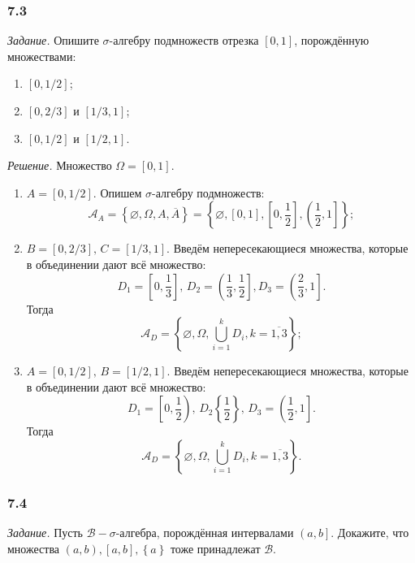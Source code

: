 \subsubsection*{7.3}

\textit{Задание.} Опишите $ \sigma $-алгебру подмножеств отрезка $ \left[ 0, 1 \right] $, порождённую множествами:
\begin{enumerate}[label=\alph*)]
\item $ \left[ 0, 1/2 \right] $;
\item $ \left[ 0, 2/3 \right] $ и $ \left[ 1/3, 1 \right] $;
\item $ \left[ 0, 1/2 \right] $ и $ \left[ 1/2,  1 \right] $.
\end{enumerate}

\textit{Решение.} Множество $ \Omega = \left[ 0, 1 \right] $.

\begin{enumerate}[label=\alph*)]
\item $A = \left[ 0, 1/2 \right] $.
Опишем $ \sigma $-алгебру подмножеств:
$$ \mathcal{A}_A =
\left\{ \varnothing, \Omega, A, \overline{A} \right\} =
\left\{ \varnothing, \left[ 0, 1 \right], \left[ 0, \frac{1}{2} \right], \left( \frac{1}{2}, 1 \right] \right\};$$
\item $B = \left[ 0, 2/3 \right], \, C = \left[ 1/3, 1 \right] $.
Введём непересекающиеся множества, которые в объединении дают всё множество:
$$D_1 =
\left[ 0, \frac{1}{3} \right], \,
D_2 =
\left( \frac{1}{3}, \frac{1}{2} \right],
D_3 =
\left( \frac{2}{3}, 1 \right].$$
Тогда
$$ \mathcal{A}_D =
\left\{ \varnothing, \Omega, \bigcup \limits_{i=1}^k D_i, k = \overline{1,3} \right\};$$
\item $A = \left[ 0, 1/2 \right], \, B = \left[ 1/2,  1 \right] $.
Введём непересекающиеся множества, которые в объединении дают всё множество:
$$D_1 =
\left[ 0, \frac{1}{2} \right), \,
D_2 \left\{ \frac{1}{2} \right\}, \,
D_3 = \left( \frac{1}{2}, 1 \right].$$
Тогда
$$ \mathcal{A}_D =
\left\{ \varnothing, \Omega, \bigcup \limits_{i=1}^k D_i, k = \overline{1,3} \right\}.$$
\end{enumerate}

\subsubsection*{7.4}

\textit{Задание.} Пусть $ \mathcal{B} - \sigma $-алгебра, порождённая интервалами $ \left( a, b \right] $.
Докажите, что множества $ \left( a, b \right), \left[ a, b \right], \left\{ a \right\} $ тоже принадлежат $ \mathcal{B} $.

